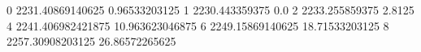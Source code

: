 0 2231.40869140625 0.96533203125
1 2230.443359375 0.0
2 2233.255859375 2.8125
4 2241.406982421875 10.963623046875
6 2249.15869140625 18.71533203125
8 2257.30908203125 26.86572265625
